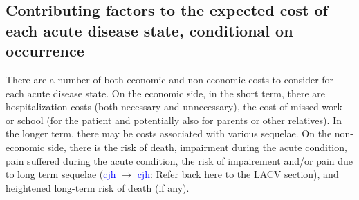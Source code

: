 \documentclass[12pt]{article}
\newcommand{\cjh}{\textcolor{blue}{cjh}}
\newcommand{\tjh}{\textcolor{red}{tjh}}
\newcommand{\msg}[3]{(#1 $\rightarrow$ #2: #3)}
\newcommand{\mcc}[1]{\msg\cjh\cjh{#1}}
\newcommand{\mct}[1]{\msg\cjh\tjh{#1}}
\begin{document}




        \subsection{Contributing factors to the expected cost of each acute disease state, conditional on occurrence}
            There are a number of both economic and non-economic costs to consider for each acute disease state. On the economic side, in the short term, there are hospitalization costs (both necessary and unnecessary), the cost of missed work or school (for the patient and potentially also for parents or other relatives). In the longer term, there may be costs associated with various sequelae. On the non-economic side, there is the risk of death, impairment during the acute condition, pain suffered during the acute condition, the risk of impairement and/or pain due to long term sequelae \mcc{Refer back here to the LACV section}, and heightened long-term risk of death (if any).
\end{document}
